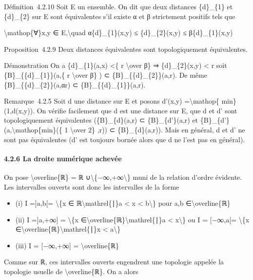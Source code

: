 \documentclass[]{article}
\begin{document}
Définition~4.2.10 Soit E un ensemble. On dit que deux distances
\{d\}\_\{1\} et \{d\}\_\{2\} sur E sont équivalentes s'il existe α et β
strictement positifs tels que

\textbackslash{}mathop\{∀\}x,y ∈ E,\textbackslash{}quad
α\{d\}\_\{1\}(x,y) ≤ \{d\}\_\{2\}(x,y) ≤ β\{d\}\_\{1\}(x,y)

Proposition~4.2.9 Deux distances équivalentes sont topologiquement
équivalentes.

Démonstration On a \{d\}\_\{1\}(a,x) \textless{}\{ r
\textbackslash{}over β\} ⇒ \{d\}\_\{2\}(x,y) \textless{} r soit
\{B\}\_\{\{d\}\_\{1\}\}(a,\{ r \textbackslash{}over β\} ) ⊂
\{B\}\_\{\{d\}\_\{2\}\}(a,r). De même \{B\}\_\{\{d\}\_\{2\}\}(a,αr) ⊂
\{B\}\_\{\{d\}\_\{1\}\}(a,r).

Remarque~4.2.5 Soit d une distance sur E et posons d'(x,y)
=\textbackslash{}mathop\{ min\}(1,d(x,y)). On vérifie facilement que d
est une distance sur E, que d et d' sont topologiquement équivalentes
(\{B\}\_\{d\}(a,r) ⊂ \{B\}\_\{d'\}(a,r) et
\{B\}\_\{d'\}(a,\textbackslash{}mathop\{min\}(\{ 1 \textbackslash{}over
2\} ,r)) ⊂ \{B\}\_\{d\}(a,r)). Mais en général, d et d' ne sont pas
équivalentes (d' est toujours bornée alors que d ne l'est pas en
général).

\paragraph{4.2.6 La droite numérique achevée}

On pose \textbackslash{}overline\{ℝ\} = ℝ
∪\textbackslash{}\{−∞,+∞\textbackslash{}\} muni de la relation d'ordre
évidente. Les intervalles ouverts sont donc les intervalles de la forme

\begin{itemize}
\itemsep1pt\parskip0pt
\item
  (i) I ={]}a,b{[}= \textbackslash{}\{x ∈ ℝ\textbackslash{}mathrel\{∣\}a
  \textless{} x \textless{} b\textbackslash{}\} pour a,b
  ∈\textbackslash{}overline\{ℝ\}
\item
  (ii) I ={]}a,+∞{]} = \textbackslash{}\{x
  ∈\textbackslash{}overline\{ℝ\}\textbackslash{}mathrel\{∣\}a
  \textless{} x\textbackslash{}\} ou I = {[}−∞,a{[}= \textbackslash{}\{x
  ∈\textbackslash{}overline\{ℝ\}\textbackslash{}mathrel\{∣\}x
  \textless{} a\textbackslash{}\}
\item
  (iii) I = {[}−∞,+∞{]} = \textbackslash{}overline\{ℝ\}
\end{itemize}

Comme sur ℝ, ces intervalles ouverts engendrent une topologie appelée la
topologie usuelle de \textbackslash{}overline\{ℝ\}. On a alors
\end{document}
